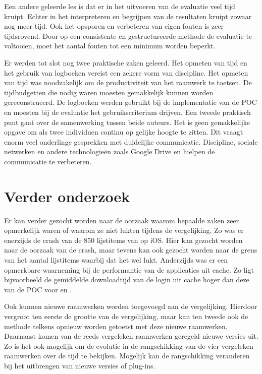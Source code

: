 Een andere geleerde les is dat er in het uitvoeren van de evaluatie veel tijd kruipt.
Echter in het interpreteren en begrijpen van de resultaten kruipt zowaar nog meer tijd.
Ook het opsporen en verbeteren van eigen fouten is zeer tijdsrovend.
Door op een consistente en gestructureerde methode de evaluatie te voltooien, moet het aantal fouten tot een minimum worden beperkt.

Er werden tot slot nog twee praktische zaken geleerd.
Het opmeten van tijd en het gebruik van logboeken vereist een zekere vorm van discipline.
Het opmeten van tijd was noodzakelijk om de productiviteit van het raamwerk te toetsen.
De tijdbudgetten die nodig waren moesten gemakkelijk kunnen worden gereconstrueerd.
De logboeken werden gebruikt bij de implementatie van de POC en moesten bij de evaluatie het gebruikscriterium drijven.
Een tweede praktisch punt gaat over de samenwerking tussen beide auteurs.
Het is geen gemakkelijke opgave om als twee individuen continu op gelijke hoogte te zitten.
Dit vraagt enorm veel onderlinge gesprekken met duidelijke communicatie.
Discipline, sociale netwerken en andere technologieën zoals Google Drive en \gh{} hielpen de communicatie te verbeteren.

\section{Verder onderzoek} %
Er kan verder gezocht worden naar de oorzaak waarom bepaalde zaken zeer opmerkelijk waren of waarom ze niet lukten tijdens de vergelijking.
Zo was er enerzijds de crash van de 850 lijstitems van \kendo{} op iOS.
Hier kan gezocht worden naar de oorzaak van de crash, maar tevens kan ook gezocht worden naar de grens van het aantal lijstitems waarbij dat het wel lukt.
Anderzijds was er een opmerkbare waarneming bij de performantie van de applicaties uit cache. 
Zo ligt bijvoorbeeld de gemiddelde downloadtijd van de login uit cache hoger dan deze van de POC voor \jqm{} en \lungo{}. 

Ook kunnen nieuwe raamwerken worden toegevoegd aan de vergelijking.
Hierdoor vergroot ten eerste de grootte van de vergelijking, maar kan ten tweede ook de methode telkens opnieuw worden getoetst met deze nieuwe raamwerken.
Daarnaast komen van de reeds vergeleken raamwerken geregeld nieuwe versies uit.
Zo is het ook mogelijk om de evolutie in de rangschikking van de vier vergeleken raamwerken over de tijd te bekijken.
Mogelijk kan de rangschikking veranderen bij het uitbrengen van nieuwe versies of plug-ins.

